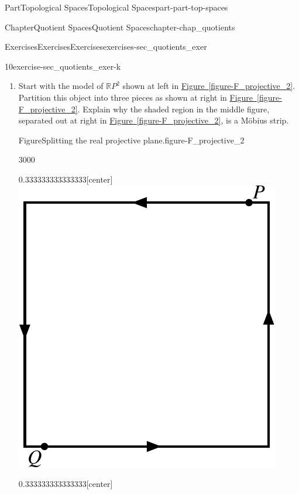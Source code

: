 \documentclass[oneside,10pt,]{book}
\newcommand{\xreffont}{\relax}
\numberwithin{equation}{chapter}
\begin{document}
\begin{partptx}{Part}{Topological Spaces}{}{Topological Spaces}{}{}{part-part-top-spaces}
\begin{chapterptx}{Chapter}{Quotient Spaces}{}{Quotient Spaces}{}{}{chapter-chap_quotients}
\begin{exercises-section}{Exercises}{Exercises}{}{Exercises}{}{}{exercises-sec_quotients_exer}
\begin{divisionexercise}{10}{}{}{exercise-sec_quotients_exer-k}
\begin{enumerate}[font=\bfseries,label=(\alph*),ref=\alph*]
\begin{enumerate}[font=\bfseries,label=(\roman*),ref=\theenumi.\roman*]%
\item{}Start with the model of \(\mathbb{R}P^2\) shown at left in \hyperref[figure-F_projective_2]{Figure~{\xreffont\ref{figure-F_projective_2}}}. Partition this object into three pieces as shown at right in \hyperref[figure-F_projective_2]{Figure~{\xreffont\ref{figure-F_projective_2}}}. Explain why the shaded region in the middle figure, separated out at right in \hyperref[figure-F_projective_2]{Figure~{\xreffont\ref{figure-F_projective_2}}}, is a Möbius strip.%
\begin{figureptx}{Figure}{Splitting the real projective plane.}{figure-F_projective_2}{}%
\begin{sidebyside}{3}{0}{0}{0}%
\begin{sbspanel}{0.333333333333333}[center]%
\includegraphics[width=\linewidth]{external/Projective_square.pdf}
\end{sbspanel}%
\begin{sbspanel}{0.333333333333333}[center]%

\end{sbspanel}
\end{sidebyside}
\end{figureptx}
\end{enumerate}
\end{enumerate}
\end{divisionexercise}
\end{exercises-section}
\end{chapterptx}
\end{partptx}
\end{document}
